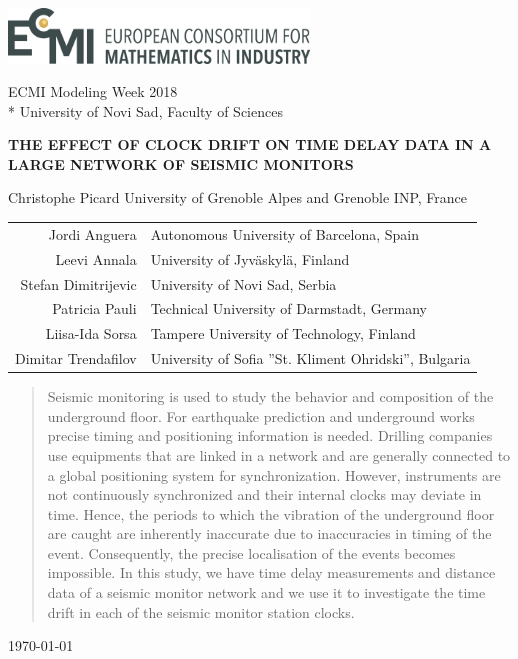 \documentclass[12pt, sumlimits, intlimits]{article}
\begin{document}
\includegraphics[width=8cm]{../figures/ecmi-logo.png}

ECMI Modeling Week 2018 \\*
University of Novi Sad, Faculty of Sciences

\begin{center}
\vspace{2.0cm}
{\Large{\textbf{\MakeUppercase{The effect of clock drift on time delay data in a large network of seismic monitors}}}}


Christophe Picard University of Grenoble Alpes and Grenoble INP, France

\begin{tabular}{rl}
Jordi Anguera & Autonomous University of Barcelona, Spain \\
Leevi Annala & University of Jyväskylä, Finland \\
Stefan Dimitrijevic & University of Novi Sad, Serbia \\
Patricia Pauli & Technical University of Darmstadt, Germany \\
Liisa-Ida Sorsa & Tampere University of Technology, Finland \\ 
Dimitar Trendafilov & University of Sofia ''St. Kliment Ohridski'', Bulgaria

\end{tabular}

\begin{abstract}
	Seismic monitoring is used to study the behavior and composition of the underground floor. For earthquake prediction and underground works precise timing and positioning information is needed. Drilling companies use equipments that are linked in a network and are generally connected to a global positioning system for synchronization. However, instruments are not continuously  synchronized and their internal clocks may deviate in time. Hence, the periods to which the vibration of the underground floor are caught are inherently inaccurate due to inaccuracies in timing of the event. Consequently, the precise localisation of the events becomes impossible. In this study, we have time delay measurements and distance data of a seismic monitor network and we use it to investigate the time drift in each of the seismic monitor station clocks.
	
\end{abstract}


\today

\end{center}
\end{document}
